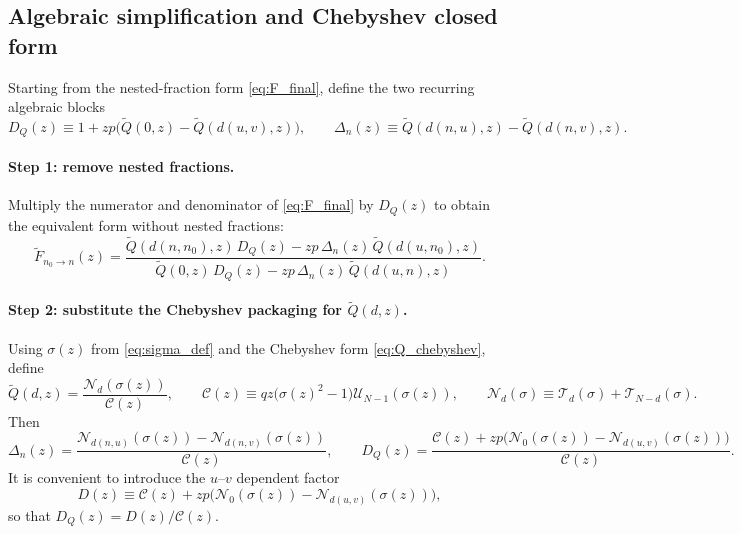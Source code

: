 \documentclass[11pt]{article}
\newcommand{\T}{\mathcal{T}}
\newcommand{\U}{\mathcal{U}}
\begin{document}
\subsection{Algebraic simplification and Chebyshev closed form}

Starting from the nested-fraction form \eqref{eq:F_final}, define the two recurring algebraic blocks
\begin{equation}
D_Q(z)\equiv 1+z p\bigl(\tilde Q(0,z)-\tilde Q(d(u,v),z)\bigr),
\qquad
\Delta_n(z)\equiv \tilde Q(d(n,u),z)-\tilde Q(d(n,v),z).
\label{eq:DQ_Delta_def}
\end{equation}

\paragraph{Step 1: remove nested fractions.}
Multiply the numerator and denominator of \eqref{eq:F_final} by $D_Q(z)$ to obtain the equivalent form without nested fractions:
\begin{equation}
\boxed{
\tilde F_{n_0\to n}(z)=
\frac{
\tilde Q(d(n,n_0),z)\,D_Q(z)-z p\,\Delta_n(z)\,\tilde Q(d(u,n_0),z)
}{
\tilde Q(0,z)\,D_Q(z)-z p\,\Delta_n(z)\,\tilde Q(d(u,n),z)
}.
}
\label{eq:F_no_nested}
\end{equation}

\paragraph{Step 2: substitute the Chebyshev packaging for $\tilde Q(d,z)$.}
Using $\sigma(z)$ from \eqref{eq:sigma_def} and the Chebyshev form \eqref{eq:Q_chebyshev}, define
\[
\tilde Q(d,z)=\frac{\mathcal{N}_d(\sigma(z))}{\mathcal{C}(z)},
\qquad
\mathcal{C}(z)\equiv qz\bigl(\sigma(z)^2-1\bigr)\U_{N-1}(\sigma(z)),
\qquad
\mathcal{N}_d(\sigma)\equiv \T_d(\sigma)+\T_{N-d}(\sigma).
\]
Then
\[
\Delta_n(z)=\frac{\mathcal{N}_{d(n,u)}(\sigma(z))-\mathcal{N}_{d(n,v)}(\sigma(z))}{\mathcal{C}(z)},
\qquad
D_Q(z)=\frac{\mathcal{C}(z)+z p\bigl(\mathcal{N}_0(\sigma(z))-\mathcal{N}_{d(u,v)}(\sigma(z))\bigr)}{\mathcal{C}(z)}.
\]
It is convenient to introduce the $u$--$v$ dependent factor
\begin{equation}
\boxed{
D(z)\equiv \mathcal{C}(z)+z p\bigl(\mathcal{N}_0(\sigma(z))-\mathcal{N}_{d(u,v)}(\sigma(z))\bigr),
}
\label{eq:D_def}
\end{equation}
so that $D_Q(z)=D(z)/\mathcal{C}(z)$.
\end{document}
